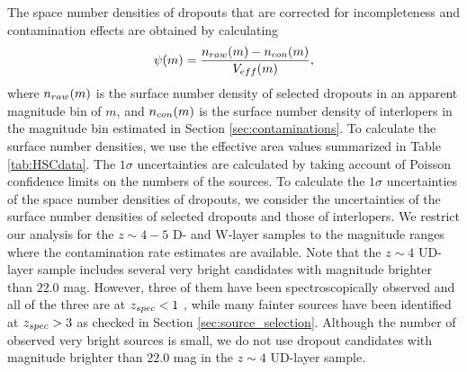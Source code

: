 \documentclass[]{pasj01}
\begin{document}
The space number densities of dropouts that are corrected for incompleteness and contamination effects 
are obtained by calculating 
\begin{equation}
\psi(m) 
= \frac{n_{\rm raw}(m) - n_{\rm con}(m)}{V_{\rm eff}(m)}, 
\end{equation}
where $n_{\rm raw}(m)$ is the surface number density of selected dropouts in an apparent magnitude bin of $m$, 
and $n_{\rm con}(m)$ is the surface number density of interlopers in the magnitude bin 
estimated in Section \ref{sec:contaminations}. 
To calculate the surface number densities, 
we use the effective area values summarized in Table \ref{tab:HSCdata}. 
The $1\sigma$ uncertainties are calculated 
by taking account of Poisson confidence limits \citep{1986ApJ...303..336G} 
on the numbers of the sources. 
To calculate the $1\sigma$ uncertainties of the space number densities of dropouts, 
we consider the uncertainties of the surface number densities of selected dropouts 
and those of interlopers.  
We restrict our analysis 
for the $z \sim 4-5$ D- and W-layer samples 
to the magnitude ranges where the contamination rate estimates are available. 
Note that the $z\sim 4$ UD-layer sample 
includes several very bright candidates with magnitude brighter than $22.0$ mag. 
However, 
three of them have been spectroscopically observed 
and all of the three are at $z_{\rm spec} < 1$ \citep{2009ApJS..184..218L}, 
while many fainter sources have been identified at $z_{\rm spec} > 3$ 
as checked in Section \ref{sec:source_selection}. 
Although the number of observed very bright sources is small,   
we do not use dropout candidates with magnitude brighter than $22.0$ mag 
in the $z\sim 4$ UD-layer sample. 
\end{document}
